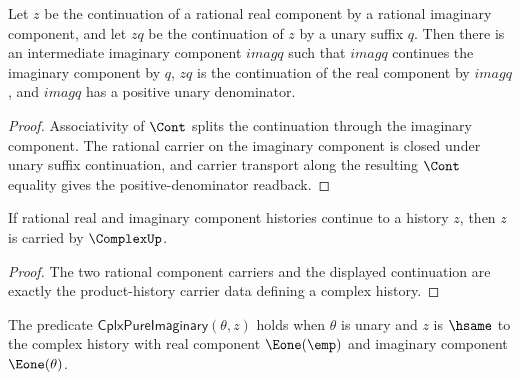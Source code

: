 \begin{theorem}
\label{thm:cplx-analytic-component-continuation-witness}
Let \(z\) be the continuation of a rational real component by a rational imaginary
component, and let \(zq\) be the continuation of \(z\) by a unary suffix \(q\).
Then there is an intermediate imaginary component \(imagq\) such that \(imagq\)
continues the imaginary component by \(q\), \(zq\) is the continuation of the
real component by \(imagq\), and \(imagq\) has a positive unary denominator.
\end{theorem}
\begin{proof}
Associativity of \(\Cont\) splits the continuation through the imaginary
component. The rational carrier on the imaginary component is closed under unary
suffix continuation, and carrier transport along the resulting \(\Cont\)
equality gives the positive-denominator readback.
\end{proof}

\begin{theorem}
\label{thm:cplx-analytic-component-continuation-complex-carrier}
If rational real and imaginary component histories continue to a history \(z\),
then \(z\) is carried by \(\ComplexUp\).
\end{theorem}
\begin{proof}
The two rational component carriers and the displayed continuation are exactly
the product-history carrier data defining a complex history.
\end{proof}

\begin{definition}
\label{def:cplx-pure-imaginary}
The predicate \(\mathsf{CplxPureImaginary}(\theta,z)\) holds when \(\theta\) is unary and \(z\) is \(\hsame\) to the complex history with real component \(\Eone(\emp)\) and imaginary component \(\Eone(\theta)\).
\end{definition}

